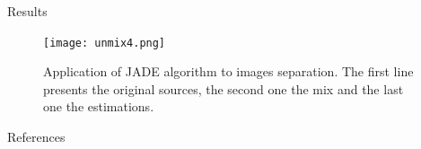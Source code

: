 \documentclass{beamer}
\begin{document}
\begin{frame}{}
\begin{columns}[T]
\begin{column}{.48\linewidth}
\begin{block}{Results}
\begin{figure}
\label{imres}
\centering
\texttt{[image: unmix4.png]}
\caption{Application of JADE algorithm to images separation. The first line presents the original sources, the second one the mix and the last one the estimations.}
\end{figure}
\end{block}

\begin{block}{References}

{}
\nocite{*}
\end{block}

\end{column}
\end{columns}

\end{frame}
\end{document}
